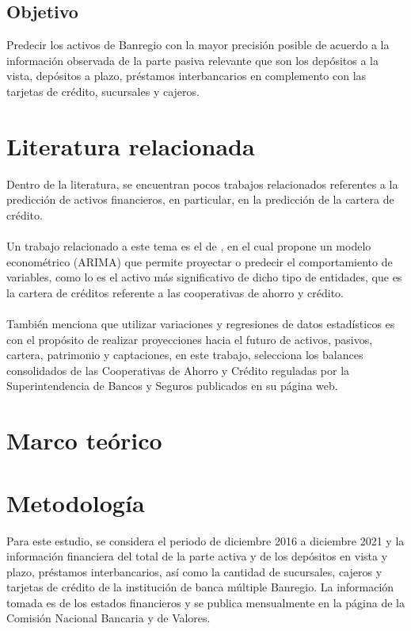 \documentclass{article}
\begin{document}
\subsection{Objetivo}

Predecir los activos de Banregio con la mayor precisión posible de acuerdo a la información observada de la parte pasiva relevante que son los depósitos a la vista, depósitos a plazo, préstamos interbancarios en complemento con las tarjetas de crédito, sucursales y cajeros.


\section{Literatura relacionada}

Dentro de la literatura, se encuentran pocos trabajos relacionados referentes a la predicción de activos financieros, en particular, en la predicción de la cartera de crédito.
\\
\\
Un trabajo relacionado a este tema es el de \citet{romero2015}, en el cual propone un modelo econométrico (ARIMA) que permite proyectar o predecir el comportamiento de variables, como lo es el activo más significativo de dicho tipo de entidades, que es la cartera de créditos referente a las cooperativas de ahorro y crédito.
\\
\\
También \citet{duque2012} menciona que utilizar variaciones y regresiones de datos estadísticos es con el propósito de realizar proyecciones hacia el futuro de activos, pasivos, cartera, patrimonio y captaciones, en este trabajo, selecciona los balances
consolidados de las Cooperativas de Ahorro y Crédito reguladas por la Superintendencia
de Bancos y Seguros publicados en su página web.



\section{Marco teórico}



\section{Metodología}

Para este estudio, se considera el periodo de diciembre 2016 a diciembre 2021 y la información financiera del total de la parte activa y de los depósitos en vista y plazo, préstamos interbancarios, así como la cantidad de sucursales, cajeros y tarjetas de crédito de la institución de banca múltiple Banregio. La información tomada es de los estados financieros y se publica mensualmente en la página de la Comisión Nacional Bancaria y de Valores.
\\
\end{document}
